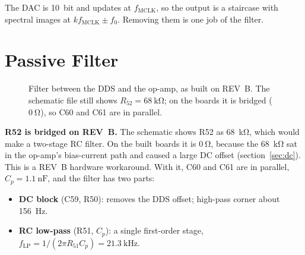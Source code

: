 \documentclass[11pt,a4paper]{article}
\newcommand{\hres}[4]{%
  \node[draw,fill=white,minimum width=0.9cm,minimum height=0.3cm,inner sep=0] (#3) at (#1,#2) {};
  \node[font=\scriptsize,above=1pt of #3] {#4};}
\newcommand{\vres}[4]{%
  \node[draw,fill=white,minimum width=0.3cm,minimum height=0.9cm,inner sep=0] (#3) at (#1,#2) {};
  \node[font=\scriptsize,right=2pt of #3] {#4};}
\newcommand{\hcap}[3]{%
  \draw[thick] (#1-0.06,#2-0.3)--(#1-0.06,#2+0.3);
  \draw[thick] (#1+0.06,#2-0.3)--(#1+0.06,#2+0.3);
  \node[font=\scriptsize,above=4pt] at (#1,#2+0.3) {#3};}
\newcommand{\vcap}[4]{%
  \draw[thick] (#1-0.3,#2-0.06)--(#1+0.3,#2-0.06);
  \draw[thick] (#1-0.3,#2+0.06)--(#1+0.3,#2+0.06);
  \node[font=\scriptsize,right=6pt] at (#1+0.3,#2) {#4};}
\newcommand{\dotnode}[2]{\fill (#1,#2) circle (1.5pt);}
\begin{document}
The DAC is 10~bit and updates at $f_{\mathrm{MCLK}}$, so the output is a
staircase with spectral images at $k f_{\mathrm{MCLK}}\pm f_0$.  Removing
them is one job of the filter.

\section{Passive Filter}

\begin{figure}[ht]
\centering
{}
\caption{Filter between the DDS and the op-amp, as built on REV~B.  The
         schematic file still shows $R_{52}=\SI{68}{\kilo\ohm}$; on the
         boards it is bridged ($\SI{0}{\ohm}$), so C60 and C61 are in
         parallel.}
\label{fig:filter}
\end{figure}

\textbf{R52 is bridged on REV~B.}  The schematic shows R52 as
\SI{68}{\kilo\ohm}, which would make a two-stage RC filter.  On the built
boards it is $\SI{0}{\ohm}$, because the \SI{68}{\kilo\ohm} sat in the
op-amp's bias-current path and caused a large DC offset (section~\ref{sec:dc}).
This is a REV~B hardware workaround.  With it, C60 and C61 are in parallel,
$C_p = \SI{1.1}{\nano\farad}$, and the filter has two parts:
\begin{itemize}
  \item \textbf{DC block} (C59, R50): removes the DDS offset; high-pass
        corner about \SI{156}{\hertz}.
  \item \textbf{RC low-pass} (R51, $C_p$): a single first-order stage,
        $f_{\mathrm{LP}} = 1/(2\pi R_{51}C_p) = \SI{21.3}{\kilo\hertz}$.
\end{itemize}
\end{document}
